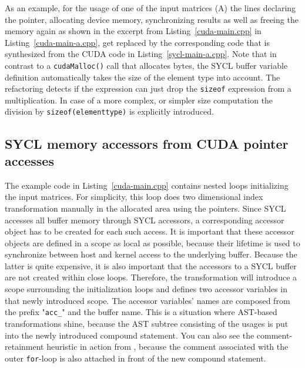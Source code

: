 \documentclass[sigconf]{acmart}
\newcommand{\inputcode}[2]{}
\newcommand{\inputsycl}[2]{}
\newcommand{\tcode}[1]{\texttt{#1}}
\begin{document}
As an example, for the usage of one of the input matrices (A) the lines declaring the pointer, allocating device memory, synchronizing results as well as freeing the memory again as shown in the excerpt from Listing~\ref{cuda-main.cpp} in Listing~\ref{cuda-main-a.cpp}, get replaced by the corresponding code that is synthesized from the CUDA code in Listing~\ref{sycl-main-a.cpp}. Note that in contrast to a \tcode{cudaMalloc()} call that allocates bytes, the SYCL buffer variable definition automatically takes the size of the element type into account. The refactoring detects if the expression can just drop the \tcode{sizeof} expression from a multiplication. In case of a more complex, or simpler size computation the division by \tcode{sizeof(elementtype)} is explicitly introduced.

\inputcode{cuda-main-a.cpp}{Setting up and cleaning up CUDA input data.}
\inputsycl{sycl-main-a.cpp}{SYCL buffer declaration replaces all lines in Listing~\ref{cuda-main-a.cpp}}

\subsection{SYCL memory accessors from CUDA pointer accesses}
\label{SYCL:accessors}
The example code in Listing~\ref{cuda-main.cpp} contains nested loops initializing the input matrices. For simplicity, this loop does two dimensional index transformation manually in the allocated area using the pointers. 
Since SYCL accesses all buffer memory through SYCL accessors, a corresponding accessor object has to be created for each such access. 
It is important that these accessor objects are defined in a scope as local as possible, because their lifetime is used to synchronize between host and kernel access to the underlying buffer. 
Because the latter is quite expensive, it is also important that the accessors to a SYCL buffer are not created within close loops. 
Therefore, the transformation will introduce a scope surrounding the initialization loops and defines two accessor variables in that newly introduced scope. The accessor variables' names are composed from the prefix "\tcode{acc_}" and the buffer name. 
This is a situation where AST-based transformations shine, because the AST subtree consisting of the usages is put into the newly introduced compound statement. 
You can also see the comment-retainment heuristic in action from \cite{Sommerlad2008}, because the comment associated with the outer \tcode{for}-loop is also attached in front of the new compound statement.
\end{document}
